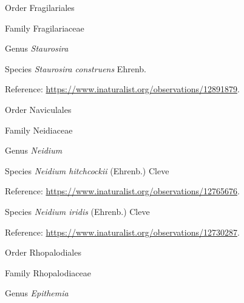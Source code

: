 \documentclass[9pt, article]{memoir}
\begin{document}
\begin{multicols}{2}
\vspace{6pt}\noindent\hspace{18pt}Order Fragilariales


\vspace{6pt}\noindent\hspace{24pt}Family Fragilariaceae


\vspace{6pt}\noindent\hspace{30pt}Genus \textit{Staurosira}


\vspace{6pt}\noindent\hspace{36pt}Species \textit{Staurosira construens} Ehrenb.


\vspace{6pt}Reference: 
\url{https://www.inaturalist.org/observations/12891879}.

\vspace{6pt}\noindent\hspace{18pt}Order Naviculales


\vspace{6pt}\noindent\hspace{24pt}Family Neidiaceae


\vspace{6pt}\noindent\hspace{30pt}Genus \textit{Neidium}


\vspace{6pt}\noindent\hspace{36pt}Species \textit{Neidium hitchcockii} (Ehrenb.) Cleve


\vspace{6pt}Reference: 
\url{https://www.inaturalist.org/observations/12765676}.

\vspace{6pt}\noindent\hspace{36pt}Species \textit{Neidium iridis} (Ehrenb.) Cleve


\vspace{6pt}Reference: 
\url{https://www.inaturalist.org/observations/12730287}.

\vspace{6pt}\noindent\hspace{18pt}Order Rhopalodiales


\vspace{6pt}\noindent\hspace{24pt}Family Rhopalodiaceae


\vspace{6pt}\noindent\hspace{30pt}Genus \textit{Epithemia}



\end{multicols}
\end{document}

